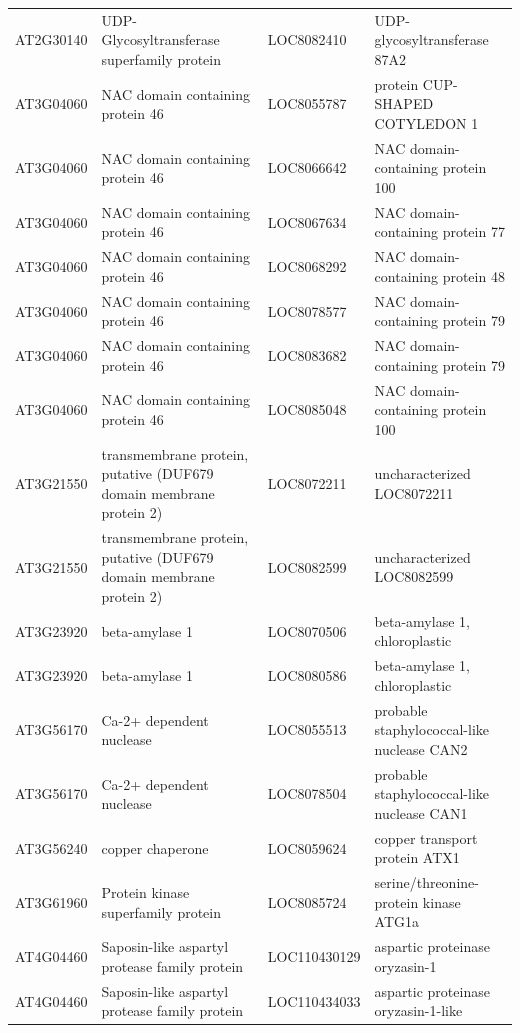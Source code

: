 \begin{longtable}{l p{5.5cm} l p{4.5cm}}
        AT2G30140 & UDP-Glycosyltransferase superfamily protein & LOC8082410 & UDP-glycosyltransferase 87A2 \\
        AT3G04060 & NAC domain containing protein 46 & LOC8055787 & protein CUP-SHAPED COTYLEDON 1 \\
        AT3G04060 & NAC domain containing protein 46 & LOC8066642 & NAC domain-containing protein 100 \\
        AT3G04060 & NAC domain containing protein 46 & LOC8067634 & NAC domain-containing protein 77 \\
        AT3G04060 & NAC domain containing protein 46 & LOC8068292 & NAC domain-containing protein 48 \\
        AT3G04060 & NAC domain containing protein 46 & LOC8078577 & NAC domain-containing protein 79 \\
        AT3G04060 & NAC domain containing protein 46 & LOC8083682 & NAC domain-containing protein 79 \\
        AT3G04060 & NAC domain containing protein 46 & LOC8085048 & NAC domain-containing protein 100 \\
        AT3G21550 & transmembrane protein, putative (DUF679 domain membrane protein 2) & LOC8072211 & uncharacterized LOC8072211 \\
        AT3G21550 & transmembrane protein, putative (DUF679 domain membrane protein 2) & LOC8082599 & uncharacterized LOC8082599 \\
        AT3G23920 & beta-amylase 1 & LOC8070506 & beta-amylase 1, chloroplastic \\
        AT3G23920 & beta-amylase 1 & LOC8080586 & beta-amylase 1, chloroplastic \\
        AT3G56170 & Ca-2+ dependent nuclease & LOC8055513 & probable staphylococcal-like nuclease CAN2 \\
        AT3G56170 & Ca-2+ dependent nuclease & LOC8078504 & probable staphylococcal-like nuclease CAN1 \\
        AT3G56240 & copper chaperone & LOC8059624 & copper transport protein ATX1 \\
        AT3G61960 & Protein kinase superfamily protein & LOC8085724 & serine/threonine-protein kinase ATG1a \\
        AT4G04460 & Saposin-like aspartyl protease family protein & LOC110430129 & aspartic proteinase oryzasin-1 \\
        AT4G04460 & Saposin-like aspartyl protease family protein & LOC110434033 & aspartic proteinase oryzasin-1-like \\

\end{longtable}
